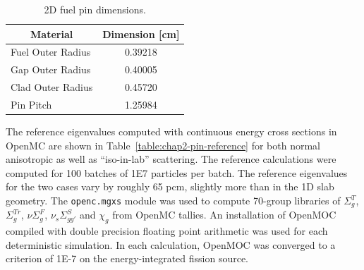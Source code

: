 \begin{table}[h!]
  \centering
  \caption{2D fuel pin dimensions.}
  \label{table:chap2-pin-dimensions} 
  \vspace{14pt}
  \begin{tabular}{l c}
  \toprule
  \multicolumn{1}{c}{\bf Material} &
  \multicolumn{1}{c}{\bf Dimension [cm]} \\
  \midrule
  Fuel Outer Radius &     0.39218 \\
  Gap Outer Radius &      0.40005 \\
  Clad Outer Radius &     0.45720 \\
  Pin Pitch &             1.25984 \\
  \bottomrule
\end{tabular}
\end{table}


The reference eigenvalues computed with continuous energy cross sections in OpenMC are shown in Table~\ref{table:chap2-pin-reference} for both normal anisotropic as well as ``iso-in-lab'' scattering. The reference calculations were computed for 100 batches of 1E7 particles per batch. The reference eigenvalues for the two cases vary by roughly 65 pcm, slightly more than in the 1D slab geometry. The \texttt{openc.mgxs} module was used to compute 70-group libraries of $\Sigma^T_g$, $\Sigma^{Tr}_g$, $\nu\Sigma^F_g$, $\nu_s\Sigma^S_{gg'}$ and $\chi_g$ from OpenMC tallies. An installation of OpenMOC compiled with double precision floating point arithmetic was used for each deterministic simulation. In each calculation, OpenMOC was converged to a criterion of 1E-7 on the energy-integrated fission source.

